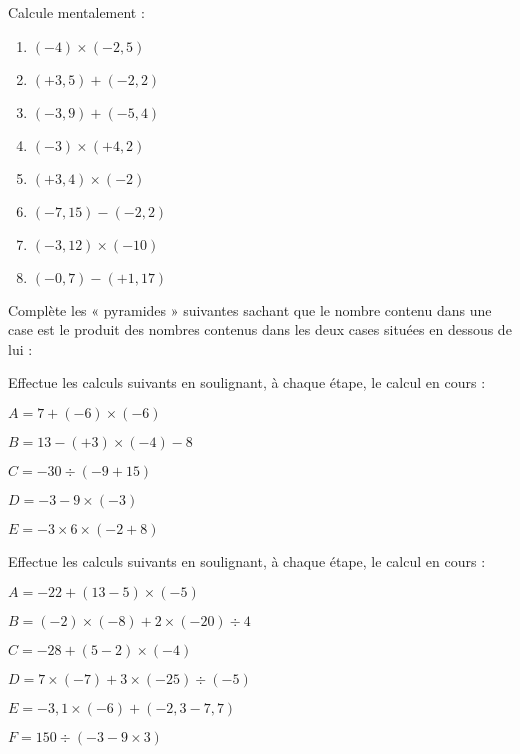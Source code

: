 \begin{exercice}Calcule mentalement :
\begin{enumerate}
\item $(-4) \times (-2,5)$
\item $(+3,5) +(-2,2)$
\item $(-3,9) +(-5,4)$
\item $(-3) \times (+4,2)$
\item $(+3,4) \times (-2)$
\item $(-7,15) -(-2,2)$
\item $(-3,12) \times (-10)$
\item $(-0,7) -(+1,17)$
\end{enumerate}
\end{exercice}



\begin{exercice}Complète les « pyramides » suivantes sachant que le nombre contenu dans une case est le produit des nombres contenus dans les deux cases situées en dessous de lui :
\begin{center}
\end{center}
\end{exercice}



\begin{exercice}Effectue les calculs suivants en soulignant, à chaque étape, le calcul en cours :

$A = 7 +(-6) \times (-6)$

$B = 13 -(+3) \times (-4) -8$

$C = -30 \div (-9 +15)$

$D = -3 -9 \times (-3)$

$E = -3 \times 6 \times (-2 +8)$
\end{exercice}



\begin{exercice}Effectue les calculs suivants en soulignant, à chaque étape, le calcul en cours :

$A = -22 +(13 -5) \times (-5)$

$B = (-2) \times (-8) +2 \times (-20) \div 4$

$C = -28 +(5 -2) \times (-4)$

$D = 7 \times (-7) +3 \times (-25) \div (-5)$

$E = -3,1 \times (-6) +(-2,3 -7,7)$

$F = 150 \div (-3 -9 \times 3)$
\end{exercice}



